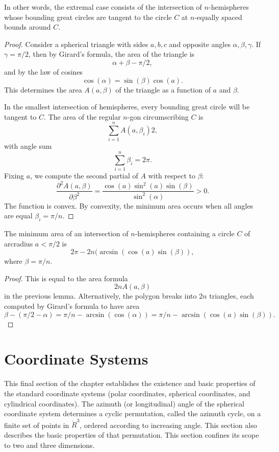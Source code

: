 In other words, the extremal case consists of the intersection of $n$-hemispheres whose bounding great circles are tangent to the circle $C$ at $n$-equally spaced bounds around $C$.

\begin{proof} 
Consider a spherical triangle with sides $a,b,c$ and opposite angles $\alpha,\beta,\gamma$.  If $\gamma=\pi/2$, then by Girard's formula, the area
of the triangle is
$$
\alpha+\beta-\pi/2,
$$
and by the law of cosines 
$$
\cos(\alpha) =\sin(\beta)\cos(a).
$$
This determines the area $A(a,\beta)$ of the triangle 
as a function of $a$ and $\beta$.

In the smallest intersection of hemispheres,  every bounding great circle will be tangent to $C$.
The area of the regular $n$-gon circumscribing $C$ is
$$
\sum_{i=1}^n A(a,\beta_i) 2,
$$
with angle sum
$$
\sum_{i=1}^n \beta_i = 2\pi.
$$
Fixing $a$, we compute the second partial of $A$ with respect to $\beta$:
$$
\frac{\partial^2 A(a,\beta)}{\partial \beta^2} = \frac{\cos(a)\sin^2(a)\sin(\beta)}{\sin^2(\alpha)} > 0.
$$
The function is convex.
By convexity, the minimum area occurs when all angles are equal
$\beta_i = \pi/n$.
\end{proof}

\begin{lemma}\label{lemma:ngon-area}
The minimum area of an intersection of $n$-hemispheres containing a circle $C$ 
of arcradius $a<\pi/2$ is
$$
2\pi - 2 n (\arcsin(\cos(a)\sin(\beta)),
$$
where $\beta = \pi/n$.
\end{lemma}

\begin{proof} This is equal to the area formula
$$
2 n A(a,\beta)
$$
in the previous lemma.
Alternatively, the polygon breaks into $2n$ triangles, each computed by Girard's
formula to have area
$$
\beta - (\pi/2 - \alpha)  = \pi/n - \arcsin(\cos(\alpha)) = 
\pi/n - \arcsin(\cos(a)\sin(\beta)).
$$
\end{proof}




\section{Coordinate Systems}

This final section of the chapter establishes the existence
and basic properties of the standard coordinate systems
(polar coordinates, spherical coordinates, and cylindrical
coordinates).  The azimuth (or longitudinal) angle of the
spherical coordinate system determines a cyclic permutation,
called the azimuth cycle,
on a finite set of points in $\ring{R}^3$, ordered according
to increasing angle.  This section also describes the basic
properties of that permutation.  This section confines its
scope to two and three dimensions.

